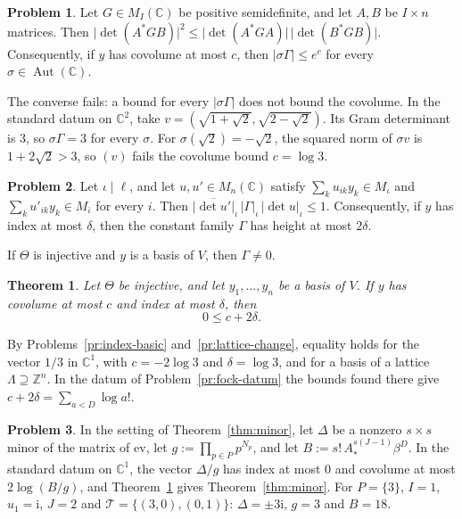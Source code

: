 \documentclass[reqno]{amsart}
\theoremstyle{definition}
\newtheorem{problem}{Problem}[section]
\theoremstyle{plain}
\newtheorem{theorem}{Theorem}[section]
\newcommand{\Z}{\mathbb{Z}}
\newcommand{\C}{\mathbb{C}}
\newcommand{\ii}{\mathrm{i}}
\newcommand{\Aut}{\operatorname{Aut}}
\begin{document}
\begin{problem}\label{pr:cs-det}
Let \(G \in M_I(\C)\) be positive semidefinite, and let \(A, B\) be \(I \times n\) matrices.  Then \(\lvert \det(A^* G B) \rvert^2 \le \lvert \det(A^* G A) \rvert \, \lvert \det(B^* G B) \rvert\).  Consequently, if \(y\) has covolume at most \(c\), then \(\lvert \sigma \Gamma \rvert \le e^c\) for every \(\sigma \in \Aut(\C)\).
\end{problem}

The converse fails: a bound for every \(\lvert \sigma\Gamma \rvert\) does not bound the covolume.  In the standard datum on \(\C^2\), take \(v = (\sqrt{1+\sqrt{2}}, \sqrt{2-\sqrt{2}})\).
Its Gram determinant is \(3\), so \(\sigma\Gamma = 3\) for every \(\sigma\).
For \(\sigma(\sqrt{2}) = -\sqrt{2}\), the squared norm of \(\sigma v\) is \(1+2\sqrt{2} > 3\), so \((v)\) fails the covolume bound \(c = \log 3\).

\begin{problem}\label{pr:gram-local}
Let \(\iota \mid \ell\), and let \(u, u' \in M_n(\C)\) satisfy \(\sum_k u_{ik} y_k \in M_\iota\) and \(\sum_k u'_{ik} y_k \in M_{\bar\iota}\) for every \(i\).  Then \(\lvert \overline{\det u'} \rvert_\iota \, \lvert \Gamma \rvert_\iota \, \lvert \det u \rvert_\iota \le 1\).  Consequently, if \(y\) has index at most \(\delta\), then the constant family \(\Gamma\) has height at most \(2\delta\).
\end{problem}

If \(\Theta\) is injective and \(y\) is a basis of \(V\), then \(\Gamma \ne 0\).

\begin{theorem}\label{thm:one}
Let \(\Theta\) be injective, and let \(y_1, \dots, y_n\) be a basis of \(V\).  If \(y\) has covolume at most \(c\) and index at most \(\delta\), then
\[
  0 \le c + 2\delta .
\]
\end{theorem}

By Problems~\ref{pr:index-basic} and~\ref{pr:lattice-change}, equality holds for the vector \(1/3\) in \(\C^1\), with \(c = -2\log 3\) and \(\delta = \log 3\), and for a basis of a lattice \(\Lambda \supseteq \Z^n\).  In the datum of Problem~\ref{pr:fock-datum} the bounds found there give \(c + 2\delta = \sum_{a<D} \log a!\).

\begin{problem}\label{pr:minor-again}
In the setting of Theorem~\ref{thm:minor}, let \(\Delta\) be a nonzero \(s \times s\) minor of the matrix of \(\mathrm{ev}\), let \(g := \prod_{p \in P} p^{N_p}\), and let \(B := s!\,A_*^{s(J-1)}\beta^D\).  In the standard datum on \(\C^1\), the vector \(\Delta/g\) has index at most \(0\) and covolume at most \(2\log(B/g)\), and Theorem~\ref{thm:one} gives Theorem~\ref{thm:minor}.  For \(P = \{3\}\), \(I = 1\), \(u_1 = \ii\), \(J = 2\) and \(\mathcal{T} = \{(3, 0), (0, 1)\}\): \(\Delta = \pm 3\ii\), \(g = 3\) and \(B = 18\).
\end{problem}
\end{document}
